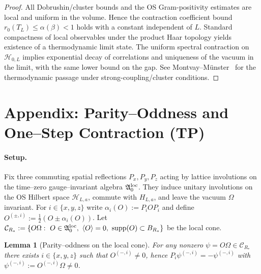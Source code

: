 \documentclass[11pt]{amsart}
\theoremstyle{plain}
\newtheorem{lemma}[theorem]{Lemma}
\theoremstyle{definition}
\theoremstyle{remark}
\renewcommand{\tfrac}[2]{\textstyle\frac{#1}{#2}}
\begin{document}
\begin{proof}
All Dobrushin/cluster bounds and the OS Gram-positivity estimates are local and uniform in the volume. Hence the contraction coefficient bound $r_0(T_L)\le \alpha(\beta)<1$ holds with a constant independent of $L$. Standard compactness of local observables under the product Haar topology yields existence of a thermodynamic limit state. The uniform spectral contraction on $\mathcal H_{0,L}$ implies exponential decay of correlations and uniqueness of the vacuum in the limit, with the same lower bound on the gap. See Montvay--M\"unster~\cite{MontvayMunster1994} for the thermodynamic passage under strong-coupling/cluster conditions.
\end{proof}

\section{Appendix: Parity--Oddness and One--Step Contraction (TP)}

\paragraph{Setup.}
Fix three commuting spatial reflections $P_x,P_y,P_z$ acting by lattice involutions on the time--zero gauge--invariant algebra $\mathfrak{A}_0^{\rm loc}$. They induce unitary involutions on the OS Hilbert space $\mathcal{H}_{L,a}$, commute with $H_{L,a}$, and leave the vacuum $\Omega$ invariant. For $i\in\{x,y,z\}$ write $\alpha_i(O):=P_i O P_i$ and define $O^{(\pm,i)}:=\tfrac12(O\pm\alpha_i(O))$. Let $\mathcal{C}_{R_*}:=\{O\Omega:\ O\in\mathfrak{A}_0^{\rm loc},\ \langle O\rangle=0,\ \mathrm{supp}(O)\subset B_{R_*}\}$ be the local cone.

\begin{lemma}[Parity--oddness on the local cone]\label{lem:oddness-tp}
For any nonzero $\psi=O\Omega\in\mathcal{C}_{R_*}$ there exists $i\in\{x,y,z\}$ such that $O^{(-,i)}\neq 0$, hence $P_i\psi^{(-,i)}=-\psi^{(-,i)}$ with $\psi^{(-,i)}:=O^{(-,i)}\Omega\neq 0$.
\end{lemma}
\end{document}
